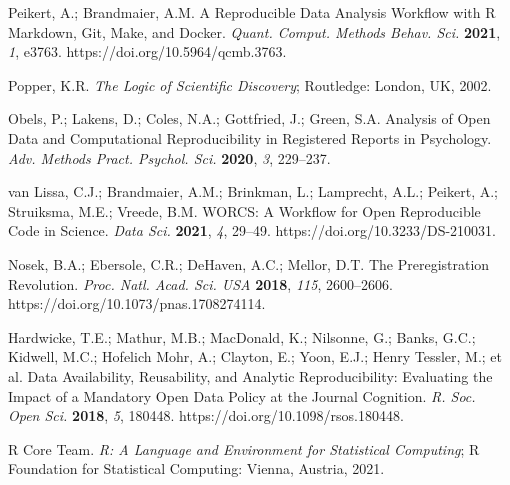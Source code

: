 \documentclass[psych,tutorial,accept,moreauthors,pdftex]{Definitions/mdpi}
\begin{document}
\begin{thebibliography}{999}
Peikert, A.; Brandmaier, A.M. A Reproducible Data Analysis Workflow with R Markdown, Git, Make, and Docker. \emph{Quant. Comput. Methods Behav. Sci.} \textbf{2021}, \emph{1}, e3763. https://doi.org/10.5964/qcmb.3763.


Popper, K.R. \emph{The Logic of Scientific Discovery}; Routledge: London, UK, 2002.


Obels, P.; Lakens, D.; Coles, N.A.; Gottfried, J.; Green, S.A. Analysis of Open Data and Computational Reproducibility in Registered Reports in Psychology. \emph{Adv. Methods Pract. Psychol. Sci.} \textbf{2020}, \emph{3}, 229--237.


van Lissa, C.J.; Brandmaier, A.M.; Brinkman, L.; Lamprecht, A.L.; Peikert, A.; Struiksma, M.E.; Vreede, B.M. WORCS: A Workflow for Open Reproducible Code in Science. \emph{Data Sci.} \textbf{2021}, \emph{4}, 29--49. https://doi.org/10.3233/DS-210031.


Nosek, B.A.; Ebersole, C.R.; DeHaven, A.C.; Mellor, D.T. The Preregistration Revolution. \emph{Proc. Natl. Acad. Sci. USA} \textbf{2018}, \emph{115}, 2600--2606. https://doi.org/10.1073/pnas.1708274114.


Hardwicke, T.E.; Mathur, M.B.; MacDonald, K.; Nilsonne, G.; Banks, G.C.; Kidwell, M.C.; Hofelich Mohr, A.; Clayton, E.; Yoon, E.J.; Henry Tessler, M.; et al. Data Availability, Reusability, and Analytic Reproducibility: Evaluating the Impact of a Mandatory Open Data Policy at the Journal Cognition. \emph{R. Soc. Open Sci.} \textbf{2018}, \emph{5}, 180448. https://doi.org/10.1098/rsos.180448.


R Core Team. \emph{R: A Language and Environment for Statistical Computing}; R Foundation for Statistical Computing: Vienna, Austria, 2021.



\end{thebibliography}
\end{document}
